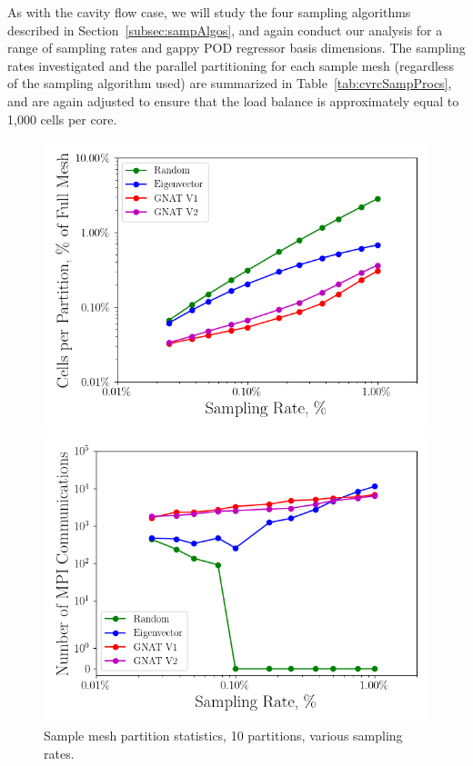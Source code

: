 As with the cavity flow case, we will study the four sampling algorithms described in Section~\ref{subsec:sampAlgos}, and again conduct our analysis for a range of sampling rates and gappy POD regressor basis dimensions. The sampling rates investigated and the parallel partitioning for each sample mesh (regardless of the sampling algorithm used) are summarized in Table~\ref{tab:cvrcSampProcs}, and are again adjusted to ensure that the load balance is approximately equal to 1,000 cells per core.

\begin{figure}
	\begin{minipage}{0.49\linewidth}
		\includegraphics[width=0.99\linewidth]{Chapters/CavityAndCVRC/Images/cvrc/deim/stats/cvrc_partition_stats.png}
	\end{minipage}
	\begin{minipage}{0.49\linewidth}
		\includegraphics[width=0.99\linewidth]{Chapters/CavityAndCVRC/Images/cvrc/deim/stats/cvrc_partition_comms.png}
	\end{minipage}
	\caption{Sample mesh partition statistics, 10 partitions, various sampling rates.}
\end{figure}

